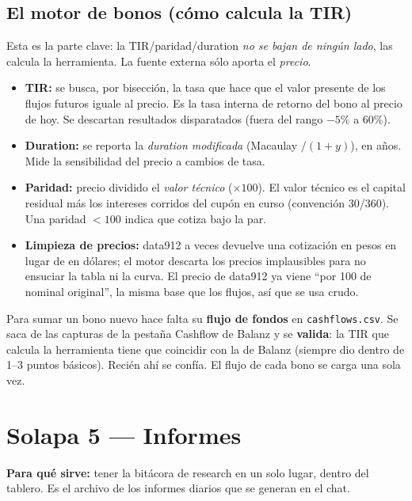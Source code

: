 \documentclass[11pt,a4paper]{article}
\newcommand{\fpath}[1]{\texttt{#1}}
\begin{document}
\subsection{El motor de bonos (c\'omo calcula la TIR)}

Esta es la parte clave: la TIR/paridad/duration \emph{no se bajan de ning\'un lado},
las calcula la herramienta. La fuente externa s\'olo aporta el \emph{precio}.

\begin{itemize}[leftmargin=1.4em]
  \item \textbf{TIR:} se busca, por bisecci\'on, la tasa que hace que el valor presente
  de los flujos futuros iguale al precio. Es la tasa interna de retorno del bono al
  precio de hoy. Se descartan resultados disparatados (fuera del rango
  $-5\%$ a $60\%$).
  \item \textbf{Duration:} se reporta la \emph{duration modificada} (Macaulay $/(1+y)$),
  en a\~nos. Mide la sensibilidad del precio a cambios de tasa.
  \item \textbf{Paridad:} precio dividido el \emph{valor t\'ecnico} ($\times 100$). El
  valor t\'ecnico es el capital residual m\'as los intereses corridos del cup\'on en
  curso (convenci\'on 30/360). Una paridad $<100$ indica que cotiza bajo la par.
  \item \textbf{Limpieza de precios:} data912 a veces devuelve una cotizaci\'on en
  pesos en lugar de en d\'olares; el motor descarta los precios implausibles para no
  ensuciar la tabla ni la curva. El precio de data912 ya viene ``por 100 de nominal
  original'', la misma base que los flujos, as\'i que se usa crudo.
\end{itemize}

\begin{regla}
Para sumar un bono nuevo hace falta su \textbf{flujo de fondos} en
\fpath{cashflows.csv}. Se saca de las capturas de la pesta\~na Cashflow de Balanz y se
\textbf{valida}: la TIR que calcula la herramienta tiene que coincidir con la de
Balanz (siempre dio dentro de 1--3 puntos b\'asicos). Reci\'en ah\'i se conf\'ia. El
flujo de cada bono se carga una sola vez.
\end{regla}

\section{Solapa 5 --- Informes}

\textbf{Para qu\'e sirve:} tener la bit\'acora de research en un solo lugar, dentro del
tablero. Es el archivo de los informes diarios que se generan en el chat.
\end{document}
